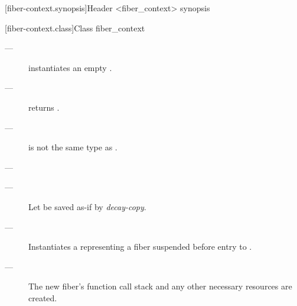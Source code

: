 
[fiber-context.synopsis]{Header <fiber\_context> synopsis}


[fiber-context.class]{Class fiber\_context}


\label{constructor}

\effects
\begin{description}
    \item[---] instantiates an empty \fiber.
\end{description}

\postcond
\begin{description}
    \item[---]  returns .
\end{description}


\constraints
\begin{description}
    \item[---]  is not the same type as .
\end{description}

\mandates
\begin{description}
    \item[---] 
\end{description}

\effects
\begin{description}
    \item[---] Let  be saved as-if by \emph{decay-copy}.
    \item[---] Instantiates a \fiber representing a fiber suspended before
              entry to .
    \item[---] The new fiber's function call stack and any other necessary
              resources are created.
\end{description}

